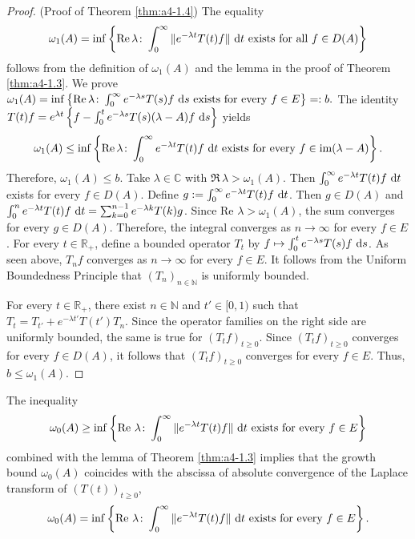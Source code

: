 \begin{proof}(Proof of Theorem \ref{thm:a4-1.4}) 
The equality 
 \[ 
 \omega_1(A) = \inf \left\{ \mathop{}\!\mathrm{Re}\,\lambda\colon\int_0^\infty \|e^{-\lambda t} T(t) f \| \,\mathop{}\!\mathrm{d}{t} \text{ exists for all } f \in D(A) \right\} 
 \] 
 follows from the definition of $\omega_1(A)$ and the lemma in the proof of Theorem \ref{thm:a4-1.3}.
We prove 
$
\omega_1(A) = \inf \left\{ \mathop{}\!\mathrm{Re}\,\lambda\colon\int_0^\infty e^{-\lambda s} T(s) f \,\mathop{}\!\mathrm{d}{s} \text{ exists for every } f \in E \right\}=: b. 
$
The identity
$    T(t) f = e^{\lambda t} \left\{ f - \int_0^t e^{-\lambda s} T(s) (\lambda - A) f \,\mathop{}\!\mathrm{d}{s} \right\}
$
yields
\[
\omega_1(A) \leq \inf \left\{ \mathop{}\!\mathrm{Re}\,\lambda\colon\int_0^\infty e^{-\lambda t} T(t) f \,\mathop{}\!\mathrm{d}{t} \text{ exists for every } f \in \text{im} (\lambda - A) \right\}.
\]
Therefore,
$\omega_1(A) \leq b.$
Take $\lambda \in \mathbb{C}$ with $\Re\,\lambda > \omega_1(A)$. 
Then $\int_0^\infty e^{-\lambda t} T(t) f \,\mathop{}\!\mathrm{d}{t}$ exists for every $f \in D(A)$. 
Define $g := \int_0^\infty e^{-\lambda t} T(t) f \,\mathop{}\!\mathrm{d}{t}$. 
Then $g \in D(A)$ and $\int_0^n e^{-\lambda t} T(t) f \,\mathop{}\!\mathrm{d}{t} = \sum_{k=0}^{n-1} e^{-\lambda k} T(k) g$. 
Since $\text{Re } \lambda > \omega_1(A)$, the sum converges for every $g \in D(A)$. 
Therefore, the integral converges as $n \to \infty$ for every $f \in E$.
For every $t \in \mathbb{R}_+$, define a bounded operator $T_t$ by $ f \mapsto \int_0^t e^{-\lambda s} T(s) f \,\mathop{}\!\mathrm{d}{s}$. 
As seen above, $T_n f$ converges as $n \to \infty$ for every $f \in E$. 
It follows from the Uniform Boundedness Principle that $(T_n)_{n \in \mathbb{N}}$ is uniformly bounded.


For every $t \in \mathbb{R}_+$, there exist $n \in \mathbb{N}$ and $t' \in [0,1)$ such that $T_t = T_{t'} + e^{-\lambda t'} T(t') T_n$. 
Since the operator families on the right side are uniformly bounded, the same is true for $(T_t f)_{t \geq 0}$. 
Since $(T_t f)_{t \geq 0}$ converges for every $f \in D(A)$, it follows that $(T_t f)_{t \geq 0}$ converges for every $f \in E$. 
Thus, $b \leq \omega_1(A)$.
\end{proof}



The inequality
\[
    \omega_0(A) \geq \inf \left\{ \text{Re } \lambda\colon\int_0^\infty \|e^{-\lambda t} T(t) f \| \,\mathop{}\!\mathrm{d}{t} 
    \text{ exists for every } f \in E \right\}
\]
combined with the lemma of Theorem \ref{thm:a4-1.3} implies that the growth bound $\omega_0(A)$ coincides with the abscissa of absolute convergence of the Laplace transform of $(T(t))_{t \geq 0}$, \ie
\begin{equation}\label{eq:a4-1.6}
   \omega_0(A) = \inf \left\{ \text{Re } \lambda\colon\int_0^\infty \|e^{-\lambda t} T(t) f \| \,\mathop{}\!\mathrm{d}{t} \text{ exists for every } f \in E \right\}.
\end{equation}



